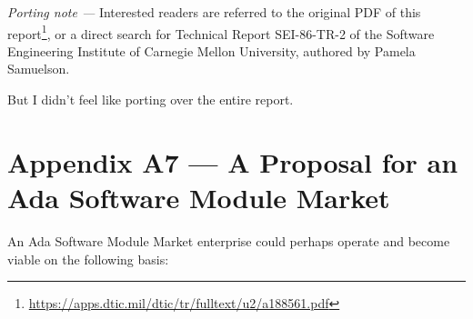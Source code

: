 \documentclass[11pt,final]{article}
\begin{document}
\textit{Porting note —} Interested readers are referred to the original PDF of
this
report\footnote{\url{https://apps.dtic.mil/dtic/tr/fulltext/u2/a188561.pdf}},
or a direct search for Technical Report SEI-86-TR-2 of the Software Engineering
Institute of Carnegie Mellon University, authored by Pamela Samuelson.

But I didn’t feel like porting over the entire report.

\newpage

\section*{Appendix A7 — A Proposal for an Ada Software Module Market}

An Ada Software Module Market enterprise could perhaps operate and become
viable on the following basis:
\end{document}
